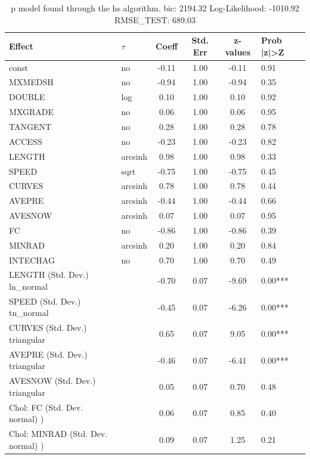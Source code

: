 \begin{table}
	\caption{p model found through the hs algorithm. bic: 2194.32 Log-Likelihood: -1010.92 RMSE_TEST: 689.03}
	\begin{center}
		\begin{tabular}{|l|l|c|c|c|l|}
			\hline
			Effect & $\tau$ & Coeff & Std. Err & z-values & Prob |z|>Z \\
			\hline
			const & no & -0.11 & 1.00 & -0.11 & 0.91 \\
			\hline
			MXMEDSH & no & -0.94 & 1.00 & -0.94 & 0.35 \\
			\hline
			DOUBLE & log & 0.10 & 1.00 & 0.10 & 0.92 \\
			\hline
			MXGRADE & no & 0.06 & 1.00 & 0.06 & 0.95 \\
			\hline
			TANGENT & no & 0.28 & 1.00 & 0.28 & 0.78 \\
			\hline
			ACCESS & no & -0.23 & 1.00 & -0.23 & 0.82 \\
			\hline
			LENGTH & arcsinh & 0.98 & 1.00 & 0.98 & 0.33 \\
			\hline
			SPEED & sqrt & -0.75 & 1.00 & -0.75 & 0.45 \\
			\hline
			CURVES & arcsinh & 0.78 & 1.00 & 0.78 & 0.44 \\
			\hline
			AVEPRE & arcsinh & -0.44 & 1.00 & -0.44 & 0.66 \\
			\hline
			AVESNOW & arcsinh & 0.07 & 1.00 & 0.07 & 0.95 \\
			\hline
			FC & no & -0.86 & 1.00 & -0.86 & 0.39 \\
			\hline
			MINRAD & arcsinh & 0.20 & 1.00 & 0.20 & 0.84 \\
			\hline
			INTECHAG & no & 0.70 & 1.00 & 0.70 & 0.49 \\
			\hline
			LENGTH (Std. Dev.) ln_normal &  & -0.70 & 0.07 & -9.69 & 0.00*** \\
			\hline
			SPEED (Std. Dev.) tn_normal &  & -0.45 & 0.07 & -6.26 & 0.00*** \\
			\hline
			CURVES (Std. Dev.) triangular &  & 0.65 & 0.07 & 9.05 & 0.00*** \\
			\hline
			AVEPRE (Std. Dev.) triangular &  & -0.46 & 0.07 & -6.41 & 0.00*** \\
			\hline
			AVESNOW (Std. Dev.) triangular &  & 0.05 & 0.07 & 0.70 & 0.48 \\
			\hline
			 Chol: FC (Std. Dev. normal) ) &  & 0.06 & 0.07 & 0.85 & 0.40 \\
			\hline
			 Chol: MINRAD (Std. Dev. normal) ) &  & 0.09 & 0.07 & 1.25 & 0.21 \\

\end{tabular}
\end{center}
\end{table}
